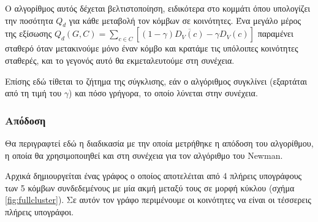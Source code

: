 \documentclass[12pt, letterpaper]{article}
\newcommand{\en}{\selectlanguage{english}}
\newcommand{\gr}{\selectlanguage{greek}}
\begin{document}
Ο αλγορίθμος αυτός δέχεται βελτιστοποίηση, ειδικότερα στο κομμάτι όπου 
υπολογίζει την ποσότητα $Q_d$ για κάθε μεταβολή τον κόμβων σε κοινότητες. 
Ένα μεγάλο μέρος της εξίσωσης $Q_d(G,C) = \sum_{c \in C} [(1 - \gamma)\overline{ D_V(c) } - \gamma D_V(c)]$
παραμένει σταθερό όταν μετακινούμε μόνο έναν κόμβο και κρατάμε τις υπόλοιπες κοινότητες
σταθερές, και το γεγονός αυτό θα εκμεταλευτούμε στη συνέχεια.

Επίσης εδώ τίθεται το ζήτημα της σύγκλισης, εάν ο αλγόριθμος συγκλίνει (εξαρτάται από 
τη τιμή του $\gamma$) και πόσο γρήγορα, το οποίο λύνεται στην συνέχεια.


\subsubsection{Απόδοση}

Θα περιγραφτεί εδώ η διαδικασία με την οποία μετρήθηκε η απόδοση του αλγορίθμου, η 
οποία θα χρησιμοποιηθεί και στη συνέχεια για τον αλγόριθμο του \en Newman. \gr

Αρχικά δημιουργείται ένας γράφος ο οποίος αποτελέιται από 4 πλήρεις υπογράφους 
των 5 κόμβων
συνδεδεμένους με μία ακμή μεταξύ τους σε μορφή κύκλου (σχήμα \ref{fig:fullcluster}).
Σε αυτόν τον γράφο περιμένουμε οι κοινότητες να είναι οι τέσσερεις πλήρεις υπογράφοι.
\end{document}
